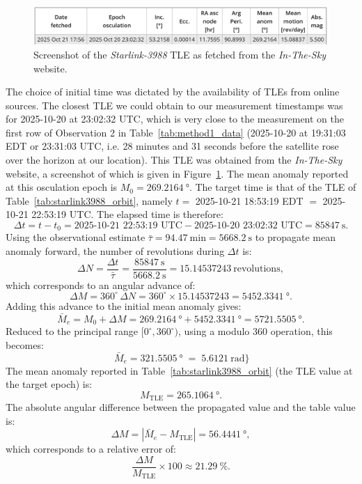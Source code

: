 \documentclass{article}
\begin{document}
\begin{figure}[h]
    \centering
    \includegraphics[width=\textwidth]{LaTeX/Figures/TLE_from_in_the_sky.png}
    \caption{Screenshot of the \textit{Starlink-3988} TLE as fetched from the \textit{In-The-Sky} website.}
    \label{fig:inthesky_tle}
\end{figure}

The choice of initial time was dictated by the availability of TLEs from online sources. The closest TLE we could obtain to our measurement timestamps was for 2025-10-20 at 23:02:32 UTC, which is very close to the measurement on the first row of Observation 2 in Table~\ref{tab:method1_data} (2025-10-20 at 19:31:03 EDT or 23:31:03 UTC, i.e. 28 minutes and 31 seconds before the satellite rose over the horizon at our location). This TLE was obtained from the \textit{In-The-Sky} website, a screenshot of which is given in Figure~\ref{fig:inthesky_tle}. The mean anomaly reported at this osculation epoch is \(M_{0}=\SI{269.2164}{\degree}\). The target time is that of the TLE of Table~\ref{tab:starlink3988_orbit}, namely \(t=\) 2025-10-21 18:53:19 EDT \(=\) 2025-10-21 22:53:19 UTC. The elapsed time is therefore:
\[
\Delta t = t - t_{0}
= \text{2025-10-21 22:53:19 UTC} - \text{2025-10-20 23:02:32 UTC}
= \SI{85847}{\second}.
\]
Using the observational estimate \(\bar{\tau}=\SI{94.47}{\minute}=\SI{5668.2}{\second}\) to propagate mean anomaly forward, the number of revolutions during \(\Delta t\) is:
\[
\Delta N = \frac{\Delta t}{\bar{\tau}}
= \frac{\SI{85847}{\second}}{\SI{5668.2}{\second}}
= \num{15.14537243}\ \text{revolutions},
\]
which corresponds to an angular advance of:
\[
\Delta M = 360^\circ\,\Delta N
= 360^\circ\times\num{15.14537243}
= \SI{5452.3341}{\degree}.
\]
Adding this advance to the initial mean anomaly gives:
\[
\bar{M}_{e} = M_{0} + \Delta M
= \SI{269.2164}{\degree} + \SI{5452.3341}{\degree}
= \SI{5721.5505}{\degree}.
\]
Reduced to the principal range \([0^\circ,360^\circ)\), using a modulo 360 operation, this becomes:
\[
\boxed{\,\bar{M}_{e} = \SI{321.5505}{\degree} \;=\; \SI{5.6121}{\radian}\}}
\]
The mean anomaly reported in Table~\ref{tab:starlink3988_orbit} (the TLE value at the target epoch) is:
\[
M_{\text{TLE}} = \SI{265.1064}{\degree}.
\]
The absolute angular difference between the propagated value and the table value is:
\[
\Delta M = |\bar{M}_{e} - M_{\text{TLE}}| = \SI{56.4441}{\degree},
\]
which corresponds to a relative error of:
\[
\frac{\Delta M}{M_{\text{TLE}}}\times 100 \approx \SI{21.29}{\percent}.
\]
\end{document}

